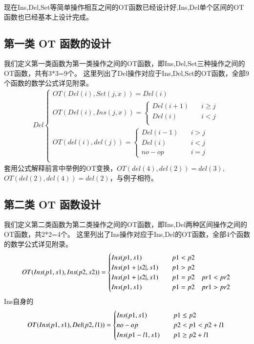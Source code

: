 现在Ins,Del,Set等简单操作相互之间的OT函数已经设计好,Ins,Del单个区间的OT函数也已经基本上设计完成。
\subsection{第一类 OT 函数的设计}
我们定义第一类函数为第一类操作之间的OT函数，即Ins,Del,Set三种操作之间的OT函数，共有3*3=9个。
这里列出了Del操作对应于Ins,Del,Set的OT函数，全部9个函数的数学公式详见附录。\cite{Sun:CSCW14}
\begin{equation}
\begin{aligned}
Del \begin{cases}
OT(Del (i), Set (j,x)) =
	{Del(i)}\\
OT(Del (i), Ins (j,x)) =\begin{cases}
	{Del (i+1)}  \quad &i \ge j\\
	{Del (i)}   \quad &i < j\\ \end{cases}\\
OT(del (i), del (j)) =\begin{cases}
	{Del (i-1)} \quad &i > j\\
	{Del (i)} \quad &i < j\\
	{no-op}   \quad &i = j \end{cases}\\
\end{cases}
\end{aligned}
\end{equation}
套用公式解释前言中举例的OT变换，$OT(del (4), del (2)) = del(3)$,$OT(del (2), del (4)) = del(2)$，与例子相符。

\subsection{第二类 OT 函数设计}
我们定义第二类函数为第二类操作之间的OT函数，即Ins,Del两种区间操作之间的OT函数，共2*2=4个。
这里列出了Ins操作对应于Ins,Del的OT函数，全部4个函数的数学公式详见附录。\cite{Sun:CSCW14}
\begin{equation}
OT(Ins(p1,s1),Ins(p2,s2))= \begin{cases}
Ins(p1,s1) \quad & p1<p2 \\
Ins(p1+ |s2|,s1) \quad & p1>p2 \\
Ins(p1+ |s2|,s1) \quad & p1=p2 \quad pr1<pr2 \\
Ins(p1,s1) \quad & p1=p2 \quad pr1>pr2
 \end{cases}\\
\end{equation}
Ins自身的
\begin{equation}
OT(Ins(p1,s1),Del(p2,l1))= \begin{cases}
Ins(p1,s1) \quad & p1 \le p2 \\
no-op \quad & p2<p1<p2+l1\\
Ins(p1-l1,s1) \quad & p1 \ge p2+l1 \end{cases}\\
\end{equation}

